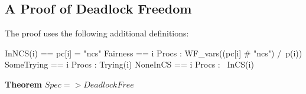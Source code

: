 \documentclass[fleqn,leqno]{article}
\begin{document}
\subsection*{A Proof of Deadlock Freedom}


The proof uses the following additional definitions:
\begin{display}
\begin{notla}
InNCS(i)   == pc[i] = "ncs"
Fairness   == \A i \in Procs : WF_vars((pc[i] # "ncs") /\ p(i))
SomeTrying == \E i \in Procs : Trying(i)
NoneInCS   == \A i \in Procs : ~InCS(i)
\end{notla}
\begin{tlatex}
%
%
\end{tlatex}
\end{display}

\vspace{.4em}

\pflongnumbers
\pflongindent
\beforePfSpace{5pt, 5pt, 2pt}
\afterPfSpace{10pt, 10pt, 5pt}
\interStepSpace{.5pt}
\noindent
\textbf{Theorem } $Spec => DeadlockFree$

\end{document}
